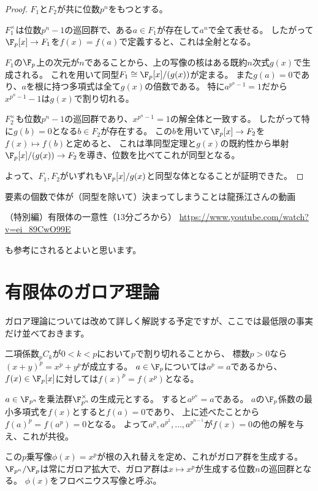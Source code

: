 \documentclass[uplatex]{jsarticle}
\begin{document}
\begin{proof}
  $F_1$と$F_2$が共に位数$p^n$をもつとする。

  $F_1^\times$は位数$p^n-1$の巡回群で、ある$a\in F_1$が存在して$a^n$で全て表せる。
  したがって$\F_p[x]\to F_1$を$f(x)=f(a)$で定義すると、これは全射となる。

  $F_1$の$\F_p$上の次元が$n$であることから、上の写像の核はある既約$n$次式$g(x)$で生成される。
  これを用いて同型$F_1\cong\F_p[x]/(g(x))$が定まる。
  また$g(a)=0$であり、$a$を根に持つ多項式は全て$g(x)$の倍数である。
  特に$a^{p^n-1}=1$だから$x^{p^n-1}-1$は$g(x)$で割り切れる。

  $F_2^\times$も位数$p^n-1$の巡回群であり、$x^{p^n-1}=1$の解全体と一致する。
  したがって特に$g(b)=0$となる$b\in F_2$が存在する。
  この$b$を用いて$\F_p[x]\to F_2$を$f(x)\mapsto f(b)$と定めると、
  これは準同型定理と$g(x)$の既約性から単射$\F_p[x]/(g(x))\to F_2$を導き、位数を比べてこれが同型となる。

  よって、$F_1, F_2$がいずれも$\F_p[x]/g(x)$と同型な体となることが証明できた。
\end{proof}

要素の個数で体が（同型を除いて）決まってしまうことは龍孫江さんの動画

（特別編）有限体の一意性（13分ごろから）
\url{https://www.youtube.com/watch?v=ei_89CwO99E}

も参考にされるとよいと思います。

\section{有限体のガロア理論}

ガロア理論については改めて詳しく解説する予定ですが、ここでは最低限の事実だけ並べておきます。

二項係数${}_pC_k$が$0<k<p$において$p$で割り切れることから、
標数$p>0$なら$(x+y)^p=x^p+y^p$が成立する。
$a\in\F_p$については$a^p=a$であるから、$f(x)\in\F_p[x]$に対しては$f(x)^p=f(x^p)$となる。

$a\in \F_{p^n}$を乗法群$\F_{p^n}^\times$の生成元とする。
すると$a^{p^n}=a$である。
$a$の$\F_p$係数の最小多項式を$f(x)$とすると$f(a)=0$であり、
上に述べたことから$f(a)^p=f(a^p)=0$となる。
よって$a^p, a^{p^2},\ldots,a^{p^{n-1}}$が$f(x)=0$の他の解を与え、これが共役。

この$p$乗写像$\phi(x)=x^p$が根の入れ替えを定め、これがガロア群を生成する。
$\F_{p^n}/\F_p$は常にガロア拡大で、ガロア群は$x\mapsto x^p$が生成する位数$n$の巡回群となる。
$\phi(x)$をフロベニウス写像と呼ぶ。
\end{document}

